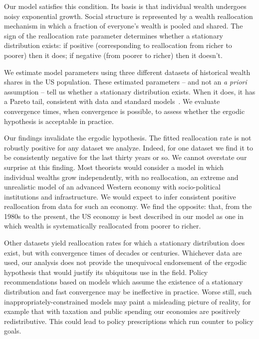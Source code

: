 Our model satisfies this condition. Its basis is that individual wealth undergoes noisy exponential growth. Social structure is represented by a wealth reallocation mechanism in which a fraction of everyone's wealth is pooled and shared. The sign of the reallocation rate parameter determines whether a stationary distribution exists: if positive (corresponding to reallocation from richer to poorer) then it does; if negative (from poorer to richer) then it doesn't.

We estimate model parameters using three different datasets of historical wealth shares in the US population. These estimated parameters -- and not an {\it a priori} assumption -- tell us whether a stationary distribution exists. When it does, it has a Pareto tail, consistent with data and standard models~\cite{Pareto1897,DragulescuYakovenko2001}. We evaluate convergence times, when convergence is possible, to assess whether the ergodic hypothesis is acceptable in practice.

Our findings invalidate the ergodic hypothesis. The fitted reallocation rate is not robustly positive for any dataset we analyze. Indeed, for one dataset we find it to be consistently negative for the last thirty years or so. We cannot overstate our surprise at this finding. Most theorists would consider a model in which individual wealths grow independently, \ie with no reallocation, an extreme and unrealistic model of an advanced Western economy with socio-political institutions and infrastructure. We would expect to infer consistent positive reallocation from data for such an economy. We find the opposite: that, from the 1980s to the present, the US economy is best described in our model as one in which wealth is systematically reallocated from poorer to richer.

Other datasets yield reallocation rates for which a stationary distribution does exist, but with convergence times of decades or centuries. Whichever data are used, our analysis does not provide the unequivocal endorsement of the ergodic hypothesis that would justify its ubiquitous use in the field. Policy recommendations based on models which assume the existence of a stationary distribution and fast convergence may be ineffective in practice. Worse still, such inappropriately-constrained models may paint a misleading picture of reality, for example that with taxation and public spending our economies are positively redistributive. This could lead to policy prescriptions which run counter to policy goals.

